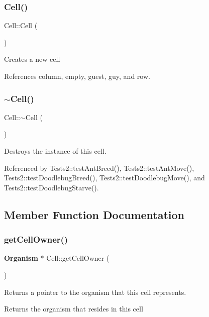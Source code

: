\subsubsection{Cell()}
{\footnotesize\ttfamily Cell\+::\+Cell (\begin{DoxyParamCaption}{ }\end{DoxyParamCaption})}

Creates a new cell 

References column, empty, guest, guy, and row.

\mbox{\label{classCell_a9fa559f7a28e2b4336c6879ca09304d8}} 
\subsubsection{$\sim$\+Cell()}
{\footnotesize\ttfamily Cell\+::$\sim$\+Cell (\begin{DoxyParamCaption}{ }\end{DoxyParamCaption})\hspace{0.3cm}{\ttfamily [virtual]}}

Destroys the instance of this cell. 

Referenced by Tests2\+::test\+Ant\+Breed(), Tests2\+::test\+Ant\+Move(), Tests2\+::test\+Doodlebug\+Breed(), Tests2\+::test\+Doodlebug\+Move(), and Tests2\+::test\+Doodlebug\+Starve().



\subsection{Member Function Documentation}
\mbox{\label{classCell_a108ebd49b69b5cad9fcc27323d162058}} 
\subsubsection{get\+Cell\+Owner()}
{\footnotesize\ttfamily \textbf{ Organism} $\ast$ Cell\+::get\+Cell\+Owner (\begin{DoxyParamCaption}{ }\end{DoxyParamCaption})}

Returns a pointer to the organism that this cell represents. \begin{DoxyReturn}{Returns}
the organism that resides in this cell 
\end{DoxyReturn}


